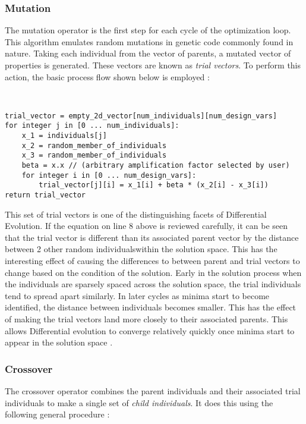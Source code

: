 \subsubsection{Mutation}
The mutation operator is the first step for each cycle of the optimization loop. This algorithm emulates random mutations in genetic code commonly found in nature. Taking each individual from the vector of parents, a mutated vector of properties is generated. These vectors are known as \emph{trial vectors}. To perform this action, the basic process flow shown below is employed \cite{diff-evol}:

\
\begin{lstlisting}[caption=Pseudocode for the Mutation Operator \cite{diff-evol},captionpos=b]
trial_vector = empty_2d_vector[num_individuals][num_design_vars]
for integer j in [0 ... num_individuals]:
    x_1 = individuals[j]
    x_2 = random_member_of_individuals
    x_3 = random_member_of_individuals
    beta = x.x // (arbitrary amplification factor selected by user)
    for integer i in [0 ... num_design_vars]:
	    trial_vector[j][i] = x_1[i] + beta * (x_2[i] - x_3[i])
return trial_vector
\end{lstlisting}

This set of trial vectors is one of the distinguishing facets of Differential Evolution. If the equation on line 8 above is reviewed carefully, it can be seen that the trial vector is different than its associated parent vector by the distance between 2 other random individualswithin the solution space. This has the interesting effect of causing the differences to between parent and trial vectors to change based on the condition of the solution. Early in the solution process when the individuals are sparsely spaced across the solution space, the trial individuals tend to spread apart similarly. In later cycles as minima start to become identified, the distance between individuals becomes smaller. This has the effect of making the trial vectors land more closely to their associated parents. This allows Differential evolution to converge relatively quickly once minima start to appear in the solution space \cite{diff-evol}.

\subsubsection{Crossover}
The crossover operator combines the parent individuals and their associated trial individuals to make a single set of \emph{child individuals}. It does this using the following general procedure \cite{diff-evol}:


